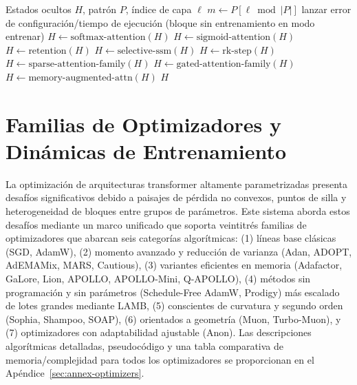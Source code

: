 \documentclass[11pt,a4paper]{article}
\begin{document}
\begin{algorithm}[t]
\caption{Paso Adelante del Mezclador Guiado por Patrón (Conceptual)}
\begin{algorithmic}[1]
\Require Estados ocultos $H$, patrón $P$, índice de capa $\ell$
\State $m \gets P[\ell \bmod |P|]$
    \State lanzar error de configuración/tiempo de ejecución (bloque sin entrenamiento en modo entrenar)
    \State $H \gets \text{softmax-attention}(H)$
    \State $H \gets \text{sigmoid-attention}(H)$
    \State $H \gets \text{retention}(H)$
    \State $H \gets \text{selective-ssm}(H)$
    \State $H \gets \text{rk-step}(H)$
    \State $H \gets \text{sparse-attention-family}(H)$
    \State $H \gets \text{gated-attention-family}(H)$
\Else
    \State $H \gets \text{memory-augmented-attn}(H)$
\EndIf
\State \Return $H$
\end{algorithmic}
\end{algorithm}

\section{Familias de Optimizadores y Dinámicas de Entrenamiento}
\label{sec:optimizer-families}

La optimización de arquitecturas transformer altamente parametrizadas presenta desafíos significativos debido a paisajes de pérdida no convexos, puntos de silla y heterogeneidad de bloques entre grupos de parámetros. Este sistema aborda estos desafíos mediante un marco unificado que soporta veintitrés familias de optimizadores que abarcan seis categorías algorítmicas: (1) líneas base clásicas (SGD, AdamW), (2) momento avanzado y reducción de varianza (Adan, ADOPT, AdEMAMix, MARS, Cautious), (3) variantes eficientes en memoria (Adafactor, GaLore, Lion, APOLLO, APOLLO-Mini, Q-APOLLO), (4) métodos sin programación y sin parámetros (Schedule-Free AdamW, Prodigy) más escalado de lotes grandes mediante LAMB, (5) conscientes de curvatura y segundo orden (Sophia, Shampoo, SOAP), (6) orientados a geometría (Muon, Turbo-Muon), y (7) optimizadores con adaptabilidad ajustable (Anon). Las descripciones algorítmicas detalladas, pseudocódigo y una tabla comparativa de memoria/complejidad para todos los optimizadores se proporcionan en el Apéndice~\ref{sec:annex-optimizers}.
\end{document}
